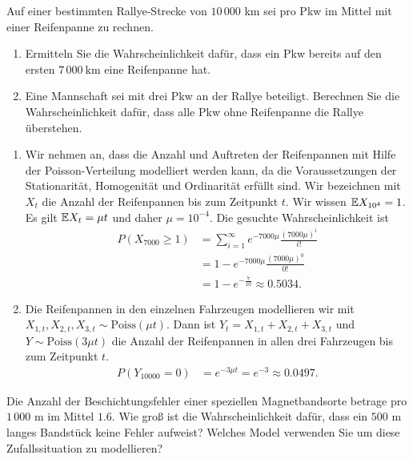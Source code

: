  Auf einer bestimmten Rallye-Strecke von $10\, 000$ km
sei pro Pkw im Mittel mit einer Reifenpanne zu rechnen. 
\begin{enumerate}
    \item Ermitteln Sie die Wahrscheinlichkeit dafür, dass ein Pkw bereits auf
        den ersten $7\, 000~\text{km}$ eine Reifenpanne hat. 
    \item Eine Mannschaft sei mit drei Pkw an der Rallye beteiligt. Berechnen
        Sie die Wahrscheinlichkeit dafür, dass alle Pkw ohne Reifenpanne die
        Rallye überstehen. 
\end{enumerate}

\solution
\begin{enumerate}
    \item Wir nehmen an, dass die Anzahl und Auftreten der Reifenpannen mit
        Hilfe der Poisson-Verteilung modelliert werden kann, da die
        Voraussetzungen der Stationarität, Homogenität und Ordinarität erfüllt
        sind.  Wir bezeichnen mit $X_t$ die Anzahl der Reifenpannen bis zum
        Zeitpunkt $t$.  Wir wissen $\mathbb E X_{10^4} = 1$. Es gilt $\mathbb E X_{t} = \mu
        t$ und daher $\mu = 10^{-4}$. Die gesuchte Wahrscheinlichkeit ist
        \begin{align*}
            P(X_{7000} \geq 1) &= \sum_{i=1}^{\infty} e^{-7000 \mu} \frac{ \left( 7000 \mu \right)^{i} }{i!} \\
            &= 1 - e^{-7000 \mu} \frac{ (7000 \mu)^{0} }{0!} \\ 
            &= 1 - e^{-\frac{7}{10}} \approx 0.5034.
        \end{align*}

    \item Die Reifenpannen in den einzelnen Fahrzeugen modellieren wir mit
        $X_{1,t}, X_{2,t}, X_{3,t} \sim \text{Poiss}(\mu t)$. Dann ist
        $Y_t=X_{1,t}+X_{2,t}+X_{3,t}$ und $Y \sim \text{Poiss}(3\mu t)$ die
        Anzahl der Reifenpannen in allen drei Fahrzeugen bis zum Zeitpunkt $t$.
        \begin{align*}
            P(Y_{10000} = 0) &= e^{ - 3 \mu t } = e^{-3} \approx 0.0497.
        \end{align*}
\end{enumerate}

 Die Anzahl der Beschichtungsfehler einer
speziellen Magnetbandsorte betrage pro $1\, 000$ m im Mittel $1.6$. Wie groß
ist die Wahrscheinlichkeit dafür, dass ein $500$ m langes Bandstück keine
Fehler aufweist? Welches Model verwenden Sie um diese Zufallssituation zu
modellieren? 

